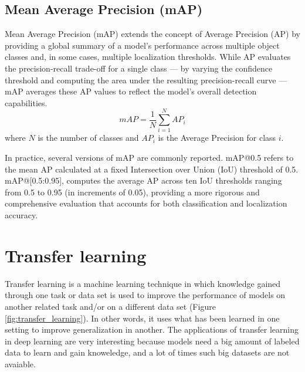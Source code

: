 \subsection*{Mean Average Precision (mAP)}
Mean Average Precision (mAP) extends the concept of Average Precision (AP) by providing a global summary of a model’s performance across multiple object classes and, in some cases, multiple localization thresholds. While AP evaluates the precision-recall trade-off for a single class — by varying the confidence threshold and computing the area under the resulting precision-recall curve — mAP averages these AP values to reflect the model’s overall detection capabilities.
\begin{equation}
    mAP = \frac{1}{N} \sum_{i=1}^{N} AP_i
\end{equation}
where \( N \) is the number of classes and \( AP_i \) is the Average Precision for class \( i \).

In practice, several versions of mAP are commonly reported. mAP@0.5 refers to the mean AP calculated at a fixed Intersection over Union (IoU) threshold of 0.5. mAP@[0.5:0.95], computes the average AP across ten IoU thresholds ranging from 0.5 to 0.95 (in increments of 0.05), providing a more rigorous and comprehensive evaluation that accounts for both classification and localization accuracy.

\section{Transfer learning}
Transfer learning is a machine learning technique in which knowledge gained through one task or data set is used to improve the performance of models on another related task and/or on a different data set (Figure \ref{fig:transfer_learning}). 
In other words, it uses what has been learned in one setting to improve generalization in another. The applications of transfer learning in deep learning are very interesting because models need a big amount of labeled data to learn and gain knoweledge, and a lot of times such big datasets are not avaiable.


